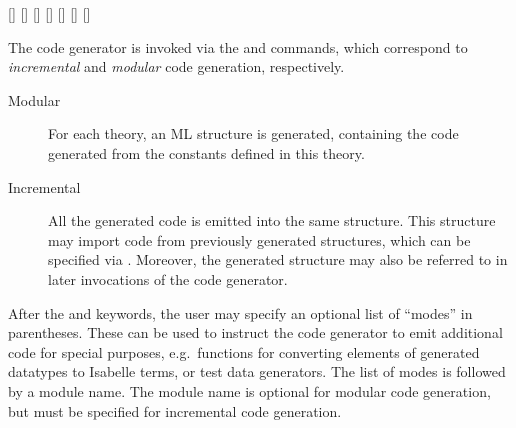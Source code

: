 \begin{isabellebody}
\begin{isamarkuptext}
\begin{railoutput}
\rail@end
{}
[]
\rail@bar
{}
[]
\rail@endbar
{}[]
[]
[]
\rail@end
{}
[]
\rail@bar
{}
[]
\rail@endbar
\rail@end
\end{railoutput}%
\end{isamarkuptext}%
\isamarkuptrue%
%
\isamarkuptrue%
%
\begin{isamarkuptext}%
The code generator is invoked via the \hyperlink{command.code-module}{\mbox{}}
  and \hyperlink{command.code-library}{\mbox{}} commands, which correspond to
  \emph{incremental} and \emph{modular} code generation, respectively.

  \begin{description}

  \item [Modular] For each theory, an ML structure is generated,
  containing the code generated from the constants defined in this
  theory.

  \item [Incremental] All the generated code is emitted into the same
  structure.  This structure may import code from previously generated
  structures, which can be specified via \hyperlink{keyword.imports}{\mbox{}}.
  Moreover, the generated structure may also be referred to in later
  invocations of the code generator.

  \end{description}

  After the \hyperlink{command.code-module}{\mbox{}} and \hyperlink{command.code-library}{\mbox{}}
  keywords, the user may specify an optional list of ``modes'' in
  parentheses. These can be used to instruct the code generator to
  emit additional code for special purposes, e.g.\ functions for
  converting elements of generated datatypes to Isabelle terms, or
  test data generators. The list of modes is followed by a module
  name.  The module name is optional for modular code generation, but
  must be specified for incremental code generation.


\end{isamarkuptext}
\end{isabellebody}
